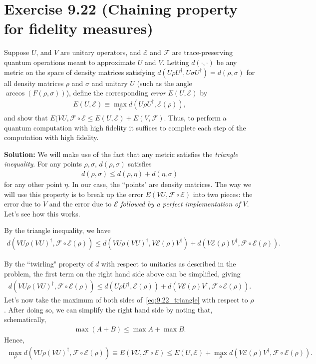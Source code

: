 \documentclass{book}
\newcommand{\mc}[1]{\mathcal{#1}}
\begin{document}
\section*{Exercise 9.22 (Chaining property for fidelity measures)}
    Suppose $U$, and $V$ are unitary operators, and $\mc{E}$ and $\mc{F}$ are trace-preserving quantum operations meant to approximate $U$ and $V$. Letting $d(\cdot,\cdot)$ be any metric on the space of density matrices satisfying $d(U\rho U^\dagger, U\sigma U^\dagger) = d(\rho, \sigma)$ for all density matrices $\rho$ and $\sigma$ and unitary $U$ (such as the angle $\arccos(F(\rho,\sigma))$), define the corresponding \emph{error} $E(U, \mc{E})$ by 
    \begin{align}
        E(U, \mc{E}) \equiv \max_\rho d(U\rho U^\dagger, \mc{E}(\rho)),
    \end{align}
    and show that $E(VU, \mc{F}\circ \mc{E} \leq E(U, \mc{E}) + E(V, \mc{F})$. Thus, to perform a quantum computation with high fidelity it suffices to complete each step of the computation with high fidelity.

    \textbf{Solution:} We will make use of the fact that any metric satisfies the \emph{triangle inequality}. For any points $\rho, \sigma$, $d(\rho, \sigma)$ satisfies
    \begin{align}
        d(\rho, \sigma) \leq d(\rho, \eta) + d(\eta, \sigma)
    \end{align}
    for any other point $\eta$. In our case, the ``points" are density matrices. The way we will use this property is to break up the error $E(VU, \mc{F}\circ\mc{E})$ into two pieces: the error due to $V$ and the error due to $\mc{E}$ \emph{followed by a perfect implementation of $V$}. Let's see how this works.

    By the triangle inequality, we have
    \begin{align}
        d(VU \rho (VU)^\dagger, \mc{F}\circ\mc{E}(\rho)) \leq d(VU \rho (VU)^\dagger, V \mc{E}(\rho) V^\dagger) + d(V \mc{E}(\rho) V^\dagger, \mc{F}\circ\mc{E}(\rho)).
    \end{align}

    By the ``twirling" property of $d$ with respect to unitaries as described in the problem, the first term on the right hand side above can be simplified, giving
    \begin{align} \label{eq:9.22_triangle}
        d(VU \rho (VU)^\dagger, \mc{F}\circ\mc{E}(\rho)) \leq d(U \rho U^\dagger, \mc{E}(\rho)) + d(V \mc{E}(\rho) V^\dagger, \mc{F}\circ\mc{E}(\rho)).
    \end{align}
    Let's now take the maximum of both sides of~\eqref{eq:9.22_triangle} with respect to $\rho$. After doing so, we can simplify the right hand side by noting that, schematically,
    \begin{align}
        \max (A + B) \leq \max A + \max B.
    \end{align}
    Hence,
    \begin{align} \label{eq:9.22_maximize}
        \max_\rho d(VU \rho (VU)^\dagger, \mc{F}\circ\mc{E}(\rho))  \equiv E(VU, \mc{F}\circ\mc{E}) \leq E(U, \mc{E}) + \max_\rho d(V \mc{E}(\rho) V^\dagger, \mc{F}\circ\mc{E}(\rho)).
    \end{align}
    
\end{document}
